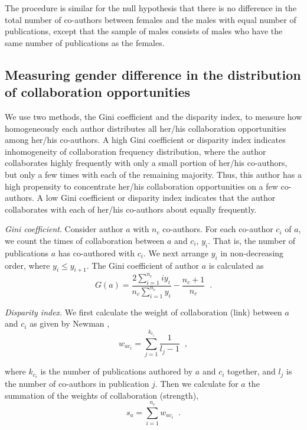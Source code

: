The procedure is similar for the null hypothesis that there is no difference in the total number of co-authors between females and the males with equal number of publications, except that the sample of males consists of males who have the same number of publications as the females.


\subsection{Measuring gender difference in the distribution of collaboration opportunities}

We use two methods, the Gini coefficient and the disparity index, to measure how homogeneously each author distributes all her/his collaboration opportunities among her/his co-authors. A high Gini coefficient or disparity index indicates inhomogeneity of collaboration frequency distribution, where the author collaborates highly frequently with only a small portion of her/his co-authors, but only a few times with each of the remaining majority. Thus, this author has a high propensity to concentrate her/his collaboration opportunities on a few co-authors. A low Gini coefficient or disparity index indicates that the author collaborates with each of her/his co-authors about equally frequently.

\textit{Gini coefficient}. Consider author $a$ with $n_c$ co-authors. For each co-author $c_i$ of $a$, we count the times of collaboration between $a$ and $c_i$, $y_i$. That is, the number of publications $a$ has co-authored with $c_i$. We next arrange $y_i$ in non-decreasing order, where $y_i \leq y_{i+1}$. The Gini coefficient of author $a$ is calculated as
\begin{equation}
G(a) = \frac{2\sum \limits_{i=1}^{n_c} iy_i}{n_c \sum \limits_{i=1}^{n_c} y_i} - \frac{n_c+1}{n_c}\;\;.
\end{equation}

\textit{Disparity index}. We first calculate the weight of collaboration (link) between $a$ and $c_i$ as given by Newman \cite{Newman2004},
\begin{equation}
w_{ac_i} = \sum \limits_{j=1}^{k_{c_i}} \frac{1}{l_j-1}\;\;,
\end{equation}

\noindent
where $k_{c_i}$ is the number of publications authored by $a$ and $c_i$ together, and $l_j$ is the number of co-authors in publication $j$. Then we calculate for $a$ the summation of the weights of collaboration (strength),
\begin{equation}
s_a = \sum \limits_{i=1}^{n_c} w_{ac_i}\;\;.
\end{equation}

